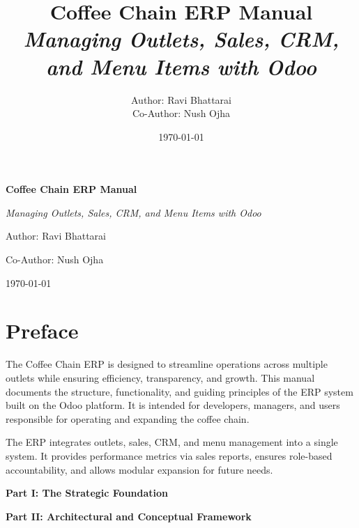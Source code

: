 \documentclass[12pt]{report}
\title{
    \vspace*{2cm}
    \Huge\bfseries Coffee Chain ERP Manual\\[0.5cm]
    \LARGE\itshape Managing Outlets, Sales, CRM, and Menu Items with Odoo
}
\author{
    \large Author: Ravi Bhattarai\\[0.3cm]
    \large Co-Author: Nush Ojha
}
\date{\today}
\newcommand{\partpage}[1]{
    \clearpage
    \thispagestyle{empty}
    \vspace*{5cm}
    \begin{center}
        {\Huge\bfseries\color{odooPurple} #1\par}
    \end{center}
    \clearpage
}
\begin{document}
\begin{titlepage}
    \centering
    \color{black} %
    {\Huge\bfseries Coffee Chain ERP Manual\par}
    \vspace{1cm}
    {\LARGE\itshape Managing Outlets, Sales, CRM, and Menu Items with Odoo\par}
    \vspace{3cm}
    {\large Author: Ravi Bhattarai\par}
    \vspace{0.3cm}
    {\large Co-Author: Nush Ojha\par}
    \vfill
    {\large \today\par}
\end{titlepage}

\chapter*{Preface}
\onehalfspacing
\color{black}
The Coffee Chain ERP is designed to streamline operations across multiple outlets while ensuring efficiency, transparency, and growth. This manual documents the structure, functionality, and guiding principles of the ERP system built on the Odoo platform. It is intended for developers, managers, and users responsible for operating and expanding the coffee chain.

The ERP integrates outlets, sales, CRM, and menu management into a single system. It provides performance metrics via sales reports, ensures role-based accountability, and allows modular expansion for future needs.

\newpage

\tableofcontents
\clearpage

\partpage{Part I: The Strategic Foundation}

\partpage{Part II: Architectural and Conceptual Framework}
\end{document}
